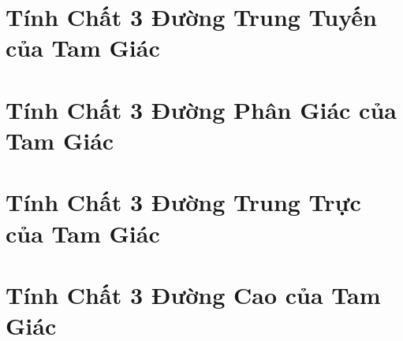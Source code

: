 \documentclass{article}
\begin{document}

\section{Tính Chất 3 Đường Trung Tuyến của Tam Giác}


\section{Tính Chất 3 Đường Phân Giác của Tam Giác}


\section{Tính Chất 3 Đường Trung Trực của Tam Giác}


\section{Tính Chất 3 Đường Cao của Tam Giác}


\printbibliography[heading=bibintoc]
	
\end{document}
